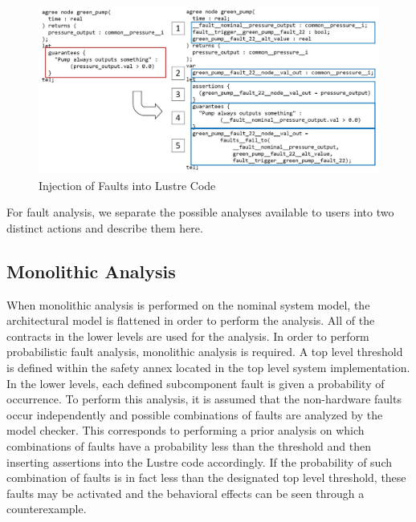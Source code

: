\begin{figure}[h!]
	\hspace*{-2cm}
	\vspace{-0.3in} 
	\begin{center}
		\includegraphics[scale=0.3]{images/lustre.jpg}
		\caption{Injection of Faults into Lustre Code}
		\label{fig:lustre}
	\end{center}
	\vspace{-0.3in}
\end{figure}

For fault analysis, we separate the possible analyses available to users into two distinct actions and describe them here.

\subsection{Monolithic Analysis}
When monolithic analysis is performed on the nominal system model, the architectural model is flattened in order to perform the analysis. All of the contracts in the lower levels are used for the analysis. In order to perform probabilistic fault analysis, monolithic analysis is required. A top level threshold is defined within the safety annex located in the top level system implementation. In the lower levels, each defined subcomponent fault is given a probability of occurrence. To perform this analysis, it is assumed that the non-hardware faults occur independently and possible combinations of faults are analyzed by the model checker. This corresponds to performing a prior analysis on which combinations of faults have a probability less than the threshold and then inserting assertions into the Lustre code accordingly. If the probability of such combination of faults is in fact less than the designated top level threshold, these faults may be activated and the behavioral effects can be seen through a counterexample.  

